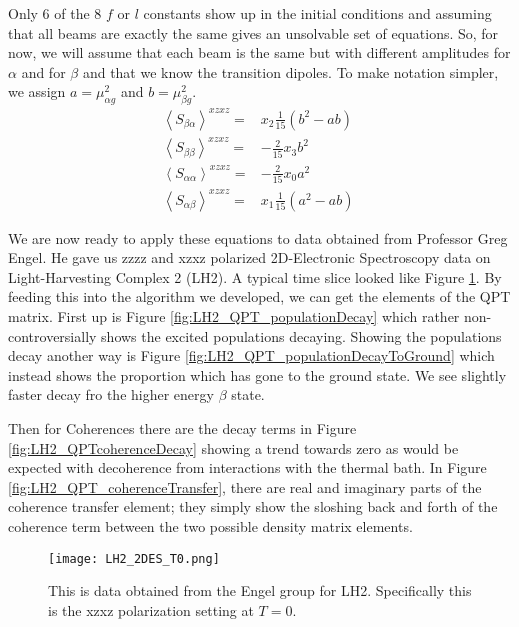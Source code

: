 Only 6 of the 8 $f$ or $l$ constants show up in the initial conditions and assuming that all beams are exactly the same gives an unsolvable set of equations.   So, for now, we will assume that each beam is the same but with different amplitudes for $\alpha$ and for $\beta$ and that we know the transition dipoles.  To make notation simpler, we assign $ a = \mu_{\alpha g}^2$ and $b = \mu_{\beta g}^2$.
\begin{align*}
	\left \langle S_{\beta \alpha} \right \rangle^{xzxz} =&   x_2 \frac{1}{15}  \left( b^2 -   a b \right)\\
	\left \langle S_{\beta \beta} \right \rangle^{xzxz} =&   -\frac{2}{15} x_3 b^2\\
	\left \langle S_{\alpha \alpha} \right \rangle^{xzxz} =& - \frac{2}{15} x_0 a^2  \\
	\left \langle S_{\alpha \beta} \right \rangle^{xzxz} =&   x_1 \frac{1}{15} \left(   a^2 - ab \right)\
\end{align*}

We are now ready to apply these equations to data obtained from Professor Greg Engel.  He gave us zzzz and xzxz polarized 2D-Electronic Spectroscopy data on Light-Harvesting Complex 2 (LH2).  A typical time slice looked like Figure \ref{fig:LH2_2DES_T0}.  By feeding this into the algorithm we developed, we can get the elements of the QPT matrix.  First up is Figure \ref{fig:LH2_QPT_populationDecay} which rather non-controversially shows the excited populations decaying.  Showing the populations decay another way is Figure \ref{fig:LH2_QPT_populationDecayToGround} which instead shows the proportion which has gone to the ground state.  We see slightly faster decay fro the higher energy $\beta$ state.

Then for Coherences there are the decay terms in Figure \ref{fig:LH2_QPTcoherenceDecay} showing a trend towards zero as would be expected with decoherence from interactions with the thermal bath.  In Figure \ref{fig:LH2_QPT_coherenceTransfer}, there are real and imaginary parts of the coherence transfer element; they simply show the sloshing back and forth of the coherence term between the two possible density matrix elements.


\begin{figure}
   \texttt{[image: LH2\_2DES\_T0.png]}
   \caption{This is data obtained from the Engel group for LH2.  Specifically this is the xzxz polarization setting at $T=0$.}
	\label{fig:LH2_2DES_T0}
\end{figure}

